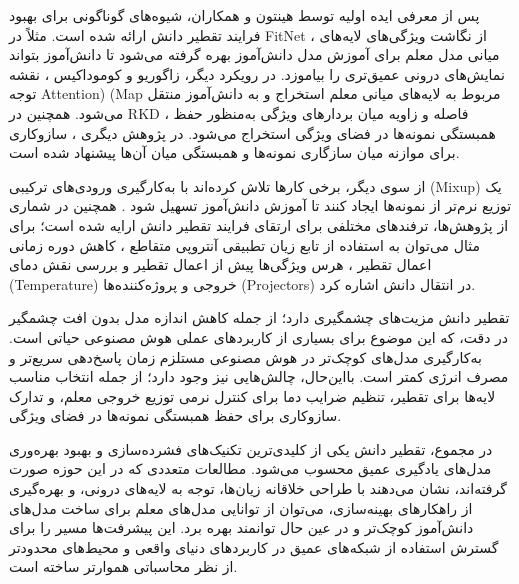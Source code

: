 پس از معرفی ایده اولیه توسط هینتون و همکاران، شیوه‌های گوناگونی برای بهبود فرایند تقطیر دانش ارائه شده است. مثلاً در FitNet \cite{romero2015fitnetshintsdeepnets}، از نگاشت ویژگی‌های لایه‌های میانی مدل معلم برای آموزش مدل دانش‌آموز بهره گرفته می‌شود تا دانش‌آموز بتواند نمایش‌های درونی عمیق‌تری را بیاموزد. در رویکرد دیگر، زاگوریو و کوموداکیس \cite{zagoruyko2017wideresidualnetworks}، نقشه توجه Attention) (Map مربوط به لایه‌های میانی معلم استخراج و به دانش‌آموز منتقل می‌شود. همچنین در RKD \cite{park2019relationalknowledgedistillation}، فاصله و زاویه میان بردارهای ویژگی به‌منظور حفظ همبستگی نمونه‌ها در فضای ویژگی استخراج می‌شود. در پژوهش دیگری \cite{peng2019correlationcongruenceknowledgedistillation}، سازوکاری برای موازنه میان سازگاری نمونه‌ها و همبستگی میان آن‌ها پیشنهاد شده است.

از سوی دیگر، برخی کارها تلاش کرده‌اند با به‌کارگیری ورودی‌های ترکیبی (Mixup) یک توزیع نرم‌تر از نمونه‌ها ایجاد کنند تا آموزش دانش‌آموز تسهیل شود \cite{zhao2021similaritytransferknowledgedistillation}. همچنین در شماری از پژوهش‌ها، ترفندهای مختلفی برای ارتقای فرایند تقطیر دانش ارایه شده است؛ برای مثال می‌توان به استفاده از تابع زیان تطبیقی آنتروپی متقاطع \cite{s20164616}، کاهش دوره زمانی اعمال تقطیر \cite{mansourian2023aicsdadaptiveinterclasssimilarity}، هرس ویژگی‌ها پیش از اعمال تقطیر \cite{park2022prunemodeldistill} و بررسی نقش دمای (Temperature) خروجی و پروژه‌کننده‌ها (Projectors) در انتقال دانش \cite{miles2024understandingroleprojectorknowledge} اشاره کرد.

تقطیر دانش مزیت‌های چشمگیری دارد؛ از جمله کاهش اندازه مدل بدون افت چشمگیر در دقت، که این موضوع برای بسیاری از کاربردهای عملی هوش مصنوعی حیاتی است. به‌کارگیری مدل‌های کوچک‌تر در هوش مصنوعی مستلزم زمان پاسخ‌دهی سریع‌تر و مصرف انرژی کمتر است. بااین‌حال، چالش‌هایی نیز وجود دارد؛ از جمله انتخاب مناسب لایه‌ها برای تقطیر، تنظیم ضرایب دما برای کنترل نرمی توزیع خروجی معلم، و تدارک سازوکاری برای حفظ همبستگی نمونه‌ها در فضای ویژگی.

در مجموع، تقطیر دانش یکی از کلیدی‌ترین تکنیک‌های فشرده‌سازی و بهبود بهره‌وری مدل‌های یادگیری عمیق محسوب می‌شود. مطالعات متعددی که در این حوزه صورت گرفته‌اند، نشان می‌دهند با طراحی خلاقانه زیان‌ها، توجه به لایه‌های درونی، و بهره‌گیری از راهکارهای بهینه‌سازی، می‌توان از توانایی مدل‌های معلم برای ساخت مدل‌های دانش‌آموز کوچک‌تر و در عین حال توانمند بهره برد. این پیشرفت‌ها مسیر را برای گسترش استفاده از شبکه‌های عمیق در کاربردهای دنیای واقعی و محیط‌های محدودتر از نظر محاسباتی هموارتر ساخته است.




